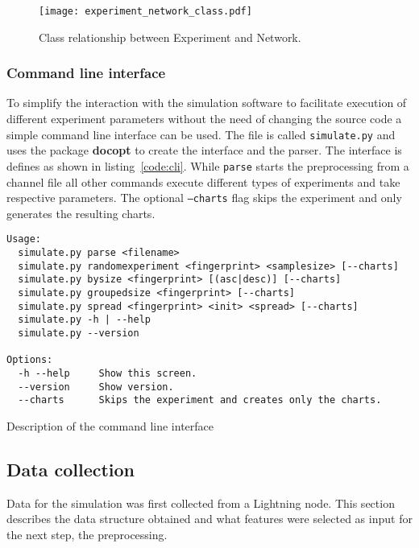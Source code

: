 \documentclass[final]{fhnwreport}       %
\begin{document}
\begin{figure}[H]
\centering
\texttt{[image: experiment\_network\_class.pdf]}
\caption{Class relationship between Experiment and Network.}
\label{fig:experiment_class}
\end{figure}

\subsubsection{Command line interface}
To simplify the interaction with the simulation software to facilitate execution of different experiment parameters without the need of changing the source code a simple command line interface can be used. The file is called \texttt{simulate.py} and uses the package \textbf{docopt} to create the interface and the parser. The interface is defines as shown in listing~\ref{code:cli}. While \texttt{parse} starts the preprocessing from a channel file all other commands execute different types of experiments and take respective parameters. The optional \texttt{---charts} flag skips the experiment and only generates the resulting charts.

\begin{listing}[H]
  \begin{verbatim}
Usage:
  simulate.py parse <filename>
  simulate.py randomexperiment <fingerprint> <samplesize> [--charts]
  simulate.py bysize <fingerprint> [(asc|desc)] [--charts]
  simulate.py groupedsize <fingerprint> [--charts]
  simulate.py spread <fingerprint> <init> <spread> [--charts]
  simulate.py -h | --help
  simulate.py --version

Options:
  -h --help     Show this screen.
  --version     Show version.
  --charts      Skips the experiment and creates only the charts.

\end{verbatim}
\caption{Description of the command line interface}
\label{code:cli}
\end{listing}

\subsection{Data collection}\label{subsec:datacol}
Data for the simulation was first collected from a Lightning node. This section describes the data structure obtained and what features were selected as input for the next step, the preprocessing. 
\end{document}
